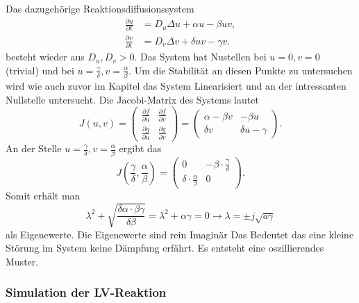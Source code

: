 Das dazugehörige Reaktionsdiffusionssystem
\begin{align}
    \frac{\partial u}{\partial t} &= D_u \Delta u + \alpha u - \beta u v, \\
    \frac{\partial v}{\partial t} &= D_v \Delta v + \delta u v - \gamma v.
    \label{reaktdiff:equation:lvsys}
\end{align}
besteht wieder aus \(D_u,D_v > 0\).
Das System hat Nustellen bei  \(u = 0,v = 0\) (trivial) und bei \(u = \frac{\gamma}{\delta}, v = \frac{\alpha}{\beta}\).
Um die Stabilität an diesen Punkte zu untersuchen wird wie auch zuvor im Kapitel das System Linearisiert und an der intressanten Nullstelle untersucht.
Die Jacobi-Matrix des Systems lautet
\begin{equation}
        J(u,v) =
        \begin{pmatrix}
        \frac{\partial f}{\partial u} & \frac{\partial f}{\partial v} \\
        \frac{\partial g}{\partial u} & \frac{\partial g}{\partial v}
        \end{pmatrix}
        =
        \begin{pmatrix}
        \alpha - \beta v & -\beta u \\
        \delta v & \delta u - \gamma
        \end{pmatrix}.
\end{equation}
An der Stelle \(u = \frac{\gamma}{\delta}, v = \frac{\alpha}{\beta}\) ergibt das
\begin{equation}
         J(\frac{\gamma}{\delta},\frac{\alpha}{\beta}) =
        \begin{pmatrix}
        0 & -\beta \cdot\frac{\gamma}{\delta} \\
        \delta \cdot \frac{\alpha}{\beta} & 0
        \end{pmatrix}. 
\end{equation}
Somit erhält man
\begin{equation}
    \lambda^2 + \sqrt{\frac{\delta \alpha \cdot \beta \gamma}{\delta \beta}}
     = 
     \lambda^2 + \alpha \gamma = 0 
     \rightarrow
     \lambda = \pm j \sqrt{a\gamma}
\end{equation}
als Eigenewerte.
Die Eigenewerte sind rein Imaginär
Das Bedeutet das eine kleine Störung im System keine Dämpfung erfährt.
Es entsteht eine oszillierendes Muster.

\subsubsection{Simulation der LV-Reaktion}

